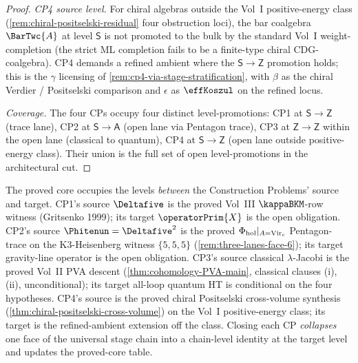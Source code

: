 \begin{proof}
\emph{CP4 source level.} For chiral algebras outside the Vol~I
positive-energy class
\textup(\cref{rem:chiral-positselski-residual} four obstruction
loci\textup), the bar coalgebra $\BarTwc{A}$ at level $\mathsf S$ is
not promoted to the bulk by the standard Vol~I weight-completion
(the strict ML completion fails to be a finite-type chiral
CDG-coalgebra). CP4 demands a refined ambient where the
$\mathsf S \to \mathsf Z$ promotion holds; this is the $\gamma$
licensing of \cref{rem:cp4-via-stage-stratification}, with $\beta$
as the chiral Verdier / Positselski comparison and $\epsilon$ as
$\effKoszul$ on the refined locus.

\emph{Coverage.} The four CPs occupy four distinct
level-promotions: CP1 at $\mathsf S \to \mathsf Z$ (trace lane),
CP2 at $\mathsf S \to \mathsf A$ (open lane via Pentagon trace),
CP3 at $\mathsf Z \to \mathsf Z$ within the open lane (classical to
quantum), CP4 at $\mathsf S \to \mathsf Z$ (open lane outside
positive-energy class). Their union is the full set of open
level-promotions in the architectural cut.
\end{proof}

\begin{remark}
\label{rem:cp-stratification-and-proved-core}
The proved core occupies the levels \emph{between} the Construction
Problems' source and target. CP1's
source $\Deltafive$ is the proved
Vol~III $\kappaBKM$-row witness (Gritsenko 1999); its target
$\operatorPrim{X}$ is the open obligation. CP2's source
$\Phitenun = \Deltafive^2$ is the proved
$\Phi_{\mathrm{hol}}|_{A = \mathrm{Vir}_c}$ Pentagon-trace on the K3-Heisenberg
witness $\{5, 5, 5\}$
\textup{(\cref{rem:three-lanes-face-6}\textup)};
its target gravity-line operator is the open obligation. CP3's
source classical $\lambda$-Jacobi is the proved Vol~II PVA descent
\textup{(}\cref{thm:cohomology-PVA-main}, classical clauses (i),
(ii), unconditional\textup{)}; its target all-loop quantum HT is
conditional on the four hypotheses. CP4's source is the proved
chiral Positselski cross-volume synthesis
\textup{(\cref{thm:chiral-positselski-cross-volume}\textup)} on the
Vol~I positive-energy class; its target is the refined-ambient
extension off the class. Closing each CP \emph{collapses} one face
of the universal stage chain into a chain-level identity at the
target level and updates the proved-core table.
\end{remark}
